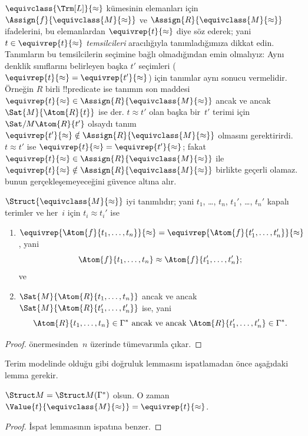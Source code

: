 \documentclass[../../../include/open-logic-section]{subfiles}
\begin{document}
\begin{explain}
$\equivclass{\Trm[L]}{\approx}$ kümesinin elemanları için
$\Assign{f}{\equivclass{M}{\approx}}$ ve
$\Assign{R}{\equivclass{M}{\approx}}$ ifadelerini, bu elemanlardan
$\equivrep{t}{\approx}$ diye söz ederek; yani
$t\in\equivrep{t}{\approx}$ \emph{temsilcileri} aracılığıyla
tanımladığımıza dikkat edin. Tanımların bu temsilcilerin seçimine bağlı
olmadığından emin olmalıyız: Aynı denklik sınıflarını belirleyen başka
$t'$ seçimleri ($\equivrep{t}{\approx}=\equivrep{t'}{\approx}$) için
tanımlar aynı sonucu vermelidir. Örneğin $R$ birli !!{predicate} ise
tanımın son maddesi $\equivrep{t}{\approx}\in
\Assign{R}{\equivclass{M}{\approx}}$ ancak ve ancak
$\Sat{M}{\Atom{R}{t}}$ ise der. $t\approx t'$ olan başka bir~$t'$
terimi için $\Sat/{M}{\Atom{R}{t'}}$ olsaydı tanım
$\equivrep{t'}{\approx}\notin\Assign{R}{\equivclass{M}{\approx}}$
olmasını gerektirirdi. $t\approx t'$ ise
$\equivrep{t}{\approx}=\equivrep{t'}{\approx}$; fakat
$\equivrep{t}{\approx}\in\Assign{R}{\equivclass{M}{\approx}}$ ile
$\equivrep{t}{\approx}\notin\Assign{R}{\equivclass{M}{\approx}}$ birlikte
geçerli olamaz.  bunun
gerçekleşemeyeceğini güvence altına alır.
\end{explain}

\begin{prop}
$\Struct{\equivclass{M}{\approx}}$ iyi tanımlıdır; yani $t_1$, \dots,
$t_n$, $t_1'$, \dots, $t_n'$ kapalı terimler ve her~$i$ için
$t_i\approx t_i'$ ise
\begin{enumerate}
\item $\equivrep{\Atom{f}{t_1,\dots,t_n}}{\approx}=
    \equivrep{\Atom{f}{t_1',\dots,t_n'}}{\approx}$, yani
  \[
  \Atom{f}{t_1,\dots,t_n}\approx\Atom{f}{t_1',\dots,t_n'};
  \]
  ve
\item $\Sat{M}{\Atom{R}{t_1,\dots,t_n}}$ ancak ve ancak
  $\Sat{M}{\Atom{R}{t_1',\dots,t_n'}}$ ise, yani
  \[
    \Atom{R}{t_1,\dots,t_n}\in\Gamma^* \text{ ancak ve ancak }
    \Atom{R}{t_1',\dots,t_n'}\in\Gamma^*.
  \]
\end{enumerate}
\end{prop}

\begin{proof}
 önermesinden~$n$ üzerinde tümevarımla çıkar.
\end{proof}

Terim modelinde olduğu gibi doğruluk lemmasını ispatlamadan önce
aşağıdaki lemma gerekir.

\begin{lem}
 $\Struct M=\Struct M(\Gamma^*)$
olsun. O zaman
$\Value{t}{\equivclass{M}{\approx}}=\equivrep{t}{\approx}$.
\end{lem}
\begin{proof}
İspat  lemmasının ispatına benzer.
\end{proof}
\end{document}
